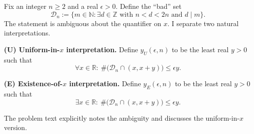 Fix an integer $n\ge 2$ and a real $\epsilon>0$. Define the ``bad'' set
\[
\mathcal D_n := \{m\in\mathbb N : \exists d\in\mathbb Z\text{ with }n<d<2n\text{ and } d\mid m\}.
\]
The statement is ambiguous about the quantifier on $x$.
I separate two natural interpretations.

\noindent\textbf{(U) Uniform-in-$x$ interpretation.}
Define $y_U(\epsilon,n)$ to be the least real $y>0$ such that
\[
\forall x\in\mathbb R:\ \#\bigl(\mathcal D_n\cap (x,x+y)\bigr)\le \epsilon y.
\]

\noindent\textbf{(E) Existence-of-$x$ interpretation.}
Define $y_E(\epsilon,n)$ to be the least real $y>0$ such that
\[
\exists x\in\mathbb R:\ \#\bigl(\mathcal D_n\cap (x,x+y)\bigr)\le \epsilon y.
\]

The problem text explicitly notes the ambiguity and discusses the uniform-in-$x$ version.
